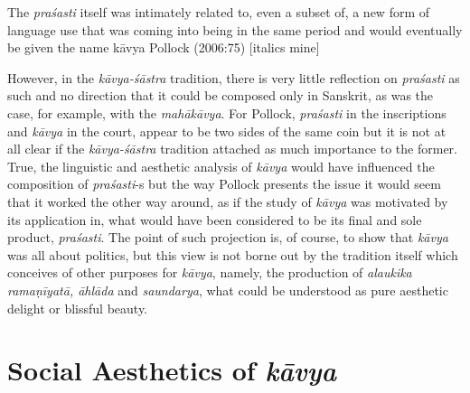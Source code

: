 \begin{myquote}
The \textsl{praśasti} itself was intimately related to, even a subset of, a new form of language use that was coming into being in the same period and would eventually be given the name kāvya 
\hfill Pollock (2006:75) [italics mine]
\end{myquote}

However, in the \textsl{kāvya-śāstra} tradition, there is very little reflection on \textsl{praśasti} as such and no direction that it could be composed only in Sanskrit, as was the case, for example, with the \textsl{mahākāvya}. For Pollock, \textsl{praśasti} in the inscriptions and \textsl{kāvya} in the court, appear to be two sides of the same coin but it is not at all clear if the \textsl{kāvya-śāstra} tradition attached as much importance to the former. True, the linguistic and aesthetic analysis of \textsl{kāvya} would have influenced the composition of \textsl{praśasti}-s but the way Pollock presents the issue it would seem that it worked the other way around, as if the study of \textsl{kāvya} was motivated by its application in, what would have been considered to be its final and sole product, \textsl{praśasti}. The point of such projection is, of course, to show that \textsl{kāvya} was all about politics, but this view is not borne out by the tradition itself which conceives of other purposes for \textsl{kāvya}, namely, the production of \textsl{alaukika ramaṇīyatā, āhlāda} and \textsl{saundarya}, what could be understood as pure aesthetic delight or blissful beauty.\\[-20pt]  

\section*{Social Aesthetics of {\sl\bfseries kāvya}}

